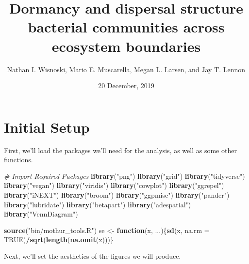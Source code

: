 \documentclass[]{article}
\title{Dormancy and dispersal structure bacterial communities across ecosystem
boundaries}
\author{Nathan I. Wisnoski, Mario E. Muscarella, Megan L. Larsen, and Jay T.
Lennon}
\date{20 December, 2019}
\newenvironment{Shaded}{\begin{snugshade}}{\end{snugshade}}
\newcommand{\CommentTok}[1]{\textcolor[rgb]{0.56,0.35,0.01}{\textit{#1}}}
\newcommand{\ControlFlowTok}[1]{\textcolor[rgb]{0.13,0.29,0.53}{\textbf{#1}}}
\newcommand{\DataTypeTok}[1]{\textcolor[rgb]{0.13,0.29,0.53}{#1}}
\newcommand{\KeywordTok}[1]{\textcolor[rgb]{0.13,0.29,0.53}{\textbf{#1}}}
\newcommand{\NormalTok}[1]{#1}
\newcommand{\OperatorTok}[1]{\textcolor[rgb]{0.81,0.36,0.00}{\textbf{#1}}}
\newcommand{\OtherTok}[1]{\textcolor[rgb]{0.56,0.35,0.01}{#1}}
\newcommand{\StringTok}[1]{\textcolor[rgb]{0.31,0.60,0.02}{#1}}
\begin{document}
\maketitle

\hypertarget{initial-setup}{%
\section{Initial Setup}\label{initial-setup}}

First, we'll load the packages we'll need for the analysis, as well as
some other functions.

\begin{Shaded}
\begin{Highlighting}[]
\CommentTok{# Import Required Packages}
\KeywordTok{library}\NormalTok{(}\StringTok{"png"}\NormalTok{)}
\KeywordTok{library}\NormalTok{(}\StringTok{"grid"}\NormalTok{)}
\KeywordTok{library}\NormalTok{(}\StringTok{"tidyverse"}\NormalTok{)   }
\KeywordTok{library}\NormalTok{(}\StringTok{"vegan"}\NormalTok{)}
\KeywordTok{library}\NormalTok{(}\StringTok{"viridis"}\NormalTok{)}
\KeywordTok{library}\NormalTok{(}\StringTok{"cowplot"}\NormalTok{)}
\KeywordTok{library}\NormalTok{(}\StringTok{"ggrepel"}\NormalTok{)}
\KeywordTok{library}\NormalTok{(}\StringTok{"iNEXT"}\NormalTok{)}
\KeywordTok{library}\NormalTok{(}\StringTok{"broom"}\NormalTok{)}
\KeywordTok{library}\NormalTok{(}\StringTok{"ggpmisc"}\NormalTok{)}
\KeywordTok{library}\NormalTok{(}\StringTok{"pander"}\NormalTok{)}
\KeywordTok{library}\NormalTok{(}\StringTok{"lubridate"}\NormalTok{)}
\KeywordTok{library}\NormalTok{(}\StringTok{"betapart"}\NormalTok{)}
\KeywordTok{library}\NormalTok{(}\StringTok{"adespatial"}\NormalTok{)}
\KeywordTok{library}\NormalTok{(}\StringTok{"VennDiagram"}\NormalTok{)}

\KeywordTok{source}\NormalTok{(}\StringTok{"bin/mothur_tools.R"}\NormalTok{)}
\NormalTok{se <-}\StringTok{ }\ControlFlowTok{function}\NormalTok{(x, ...)\{}\KeywordTok{sd}\NormalTok{(x, }\DataTypeTok{na.rm =} \OtherTok{TRUE}\NormalTok{)}\OperatorTok{/}\KeywordTok{sqrt}\NormalTok{(}\KeywordTok{length}\NormalTok{(}\KeywordTok{na.omit}\NormalTok{(x)))\}}
\end{Highlighting}
\end{Shaded}

Next, we'll set the aesthetics of the figures we will produce.
\end{document}
